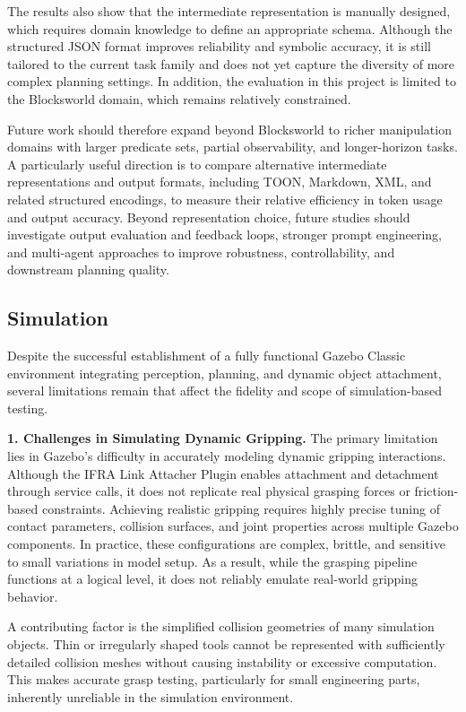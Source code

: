 \documentclass[12pt]{extarticle}
\begin{document}
The results also show that the intermediate representation is manually designed, which requires domain knowledge to define an appropriate schema. Although the structured JSON format improves reliability and symbolic accuracy, it is still tailored to the current task family and does not yet capture the diversity of more complex planning settings. In addition, the evaluation in this project is limited to the Blocksworld domain, which remains relatively constrained.

Future work should therefore expand beyond Blocksworld to richer manipulation domains with larger predicate sets, partial observability, and longer-horizon tasks. A particularly useful direction is to compare alternative intermediate representations and output formats, including TOON, Markdown, XML, and related structured encodings, to measure their relative efficiency in token usage and output accuracy. Beyond representation choice, future studies should investigate output evaluation and feedback loops, stronger prompt engineering, and multi-agent approaches to improve robustness, controllability, and downstream planning quality.

\subsection{Simulation}

Despite the successful establishment of a fully functional Gazebo Classic environment integrating perception, planning, and dynamic object attachment, several limitations remain that affect the fidelity and scope of simulation-based testing.

\textbf{1. Challenges in Simulating Dynamic Gripping.}
The primary limitation lies in Gazebo’s difficulty in accurately modeling dynamic gripping interactions. Although the IFRA Link Attacher Plugin enables attachment and detachment through service calls, it does not replicate real physical grasping forces or friction-based constraints. Achieving realistic gripping requires highly precise tuning of contact parameters, collision surfaces, and joint properties across multiple Gazebo components. In practice, these configurations are complex, brittle, and sensitive to small variations in model setup. As a result, while the grasping pipeline functions at a logical level, it does not reliably emulate real-world gripping behavior.

A contributing factor is the simplified collision geometries of many simulation objects. Thin or irregularly shaped tools cannot be represented with sufficiently detailed collision meshes without causing instability or excessive computation. This makes accurate grasp testing, particularly for small engineering parts, inherently unreliable in the simulation environment.
\end{document}
